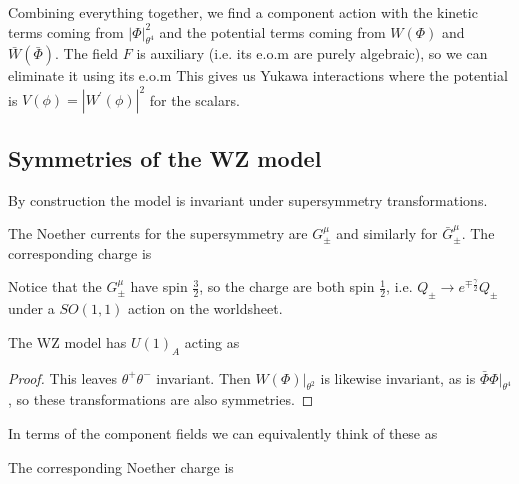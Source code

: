 \documentclass{article}
\begin{document}
Combining everything together, we find a component action 
with the kinetic terms coming from $|\Phi|^2_{\theta^4}$ and the potential terms coming from $W(\Phi)$ and $\bar{W}(\bar{\Phi})$. The field $F$ is auxiliary (i.e. its e.o.m are purely algebraic), so we can eliminate it using its e.o.m
This gives us Yukawa interactions where the potential is  $V(\phi) = |W^\prime(\phi)|^2$ for the scalars. 

\subsection{Symmetries of the WZ model }
By construction the model is invariant under supersymmetry transformations. 
\begin{prop}The Noether currents for the supersymmetry are $G^\mu_{\pm}$
and similarly for $\bar{G}_\pm^\mu$. The corresponding charge is 
\end{prop}
Notice that the $G_\pm^\mu$ have spin $\frac{3}{2}$, so the charge are both spin $\frac{1}{2}$, i.e. $Q_\pm \to e^{\mp\frac{\gamma}{2}}Q_\pm$ under a $SO(1,1)$ action on the worldsheet.
\begin{prop}
The WZ model has $U(1)_A$  acting as 
\end{prop}
\begin{proof}
This leaves $\theta^+ \theta^- $ invariant. Then $W(\Phi)|_{\theta^2}$ is likewise invariant, as is $\bar{\Phi} \Phi |_{\theta^4}$, so these transformations are also symmetries.
\end{proof}
In terms of the component fields we can equivalently think of these as 
\begin{prop}
The corresponding Noether charge is
\end{prop}
\end{document}
